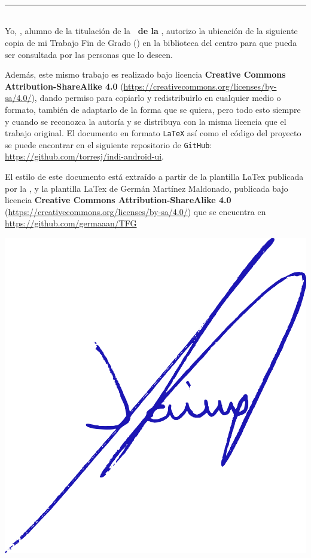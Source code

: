 \begin{center}
{\LARGE\bfseries\titulo}\\
\end{center}
\begin{center}
\autor\
\end{center}

\newpage
\thispagestyle{empty}
\
\vspace{3cm}

\noindent\rule[-1ex]{\textwidth}{2pt}\\[4.5ex]

Yo, \textbf{\autor}, alumno de la titulación \textbf{\grado} de la \textbf{\escuela\ de la \universidad}, autorizo la ubicación de la siguiente copia de mi Trabajo Fin de Grado (\textit{\titulo}) en la biblioteca del centro para que pueda ser consultada por las personas que lo deseen.

\bigskip
Además, este mismo trabajo es realizado bajo licencia \textbf{Creative Commons Attribution-ShareAlike 4.0} (\url{https://creativecommons.org/licenses/by-sa/4.0/}), dando permiso para copiarlo y redistribuirlo en cualquier medio o formato, también de adaptarlo de la forma que se quiera, pero todo esto siempre y cuando se reconozca la autoría y se distribuya con la misma licencia que el trabajo original. El documento en formato {\tt LaTeX} así como el código del proyecto se puede encontrar en el siguiente repositorio de {\tt GitHub}: \url{https://github.com/torresj/indi-android-ui}.

\bigskip
El estilo de este documento está extraído a partir de la plantilla LaTex publicada por la \escuela , y la plantilla LaTex de Germán Martínez Maldonado, publicada bajo licencia \textbf{Creative Commons Attribution-ShareAlike 4.0} (\url{https://creativecommons.org/licenses/by-sa/4.0/}) que se encuentra en \url{https://github.com/germaaan/TFG}

\vspace{1cm}
\includegraphics[scale=0.1]{../images/firmaJaimeBuena.png}

